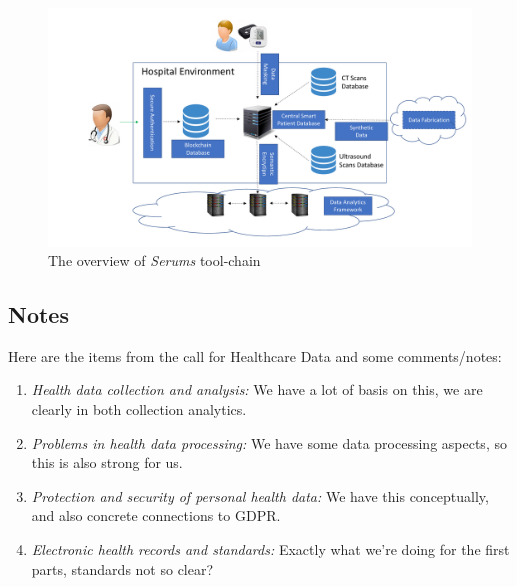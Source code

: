 \begin{figure}[h!]
    \includegraphics[scale=0.3]{images/SerumsTools.pdf}
    \caption{The overview of \emph{Serums} tool-chain}
    \label{fig:serumsTools}
\end{figure}


\subsection*{Notes}

Here are the items from the call for Healthcare Data and some comments/notes:
\begin{enumerate}
\item 
\emph{Health data collection and analysis:}
We have a lot of basis on this, we are clearly in both collection analytics.

\item 
\emph{Problems in health data processing:}
We have some data processing aspects, so this is also strong for us.

\item 
\emph{Protection and security of personal health data:}
We have this conceptually, and also concrete connections to GDPR.

\item 
\emph{Electronic health records and standards:}
Exactly what we're doing for the first parts, standards not so clear?
\end{enumerate}



